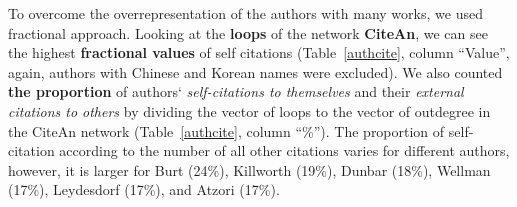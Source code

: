 \documentclass[11pt]{article} %
\begin{document}
To overcome the overrepresentation of the authors with many works, we used fractional approach. Looking at the \textbf{loops} of the network \textbf{CiteAn}, we can see the highest \textbf{fractional values} of self citations (Table~\ref{authcite}, column ``Value'', again, authors with Chinese and Korean names were excluded).  We also counted \textbf{the proportion} of authors` \textit{self-citations to themselves} and their \textit{external citations to others} by dividing the vector of loops to the vector of outdegree in the CiteAn network (Table~\ref{authcite}, column ``\%''). The proportion of self-citation according to the number of all other citations varies for different authors, however, it is larger for Burt (24\%), Killworth (19\%), Dunbar (18\%), Wellman (17\%), Leydesdorf (17\%), and Atzori (17\%). \medskip  
\end{document}
